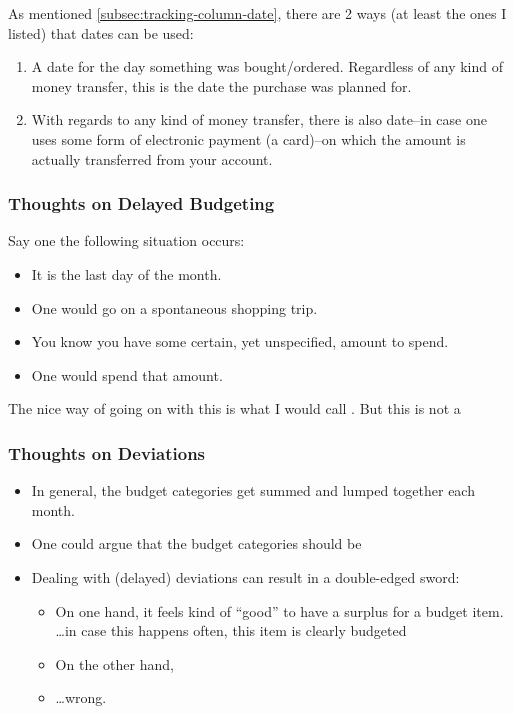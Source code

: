 As mentioned \autoref{subsec:tracking-column-date}, there are 2 ways (at least the ones I listed) that dates can be used:
\begin{enumerate}
	\item A date for the day something was bought/ordered.
	Regardless of any kind of money transfer, this is the date the purchase was planned for.
	\item With regards to any kind of money transfer, there is also date--in case one uses some form of electronic payment (\eg a card)--on which the amount is actually transferred from your account.
\end{enumerate}

\subsubsection{Thoughts on Delayed Budgeting}
\label{subsubsec:thoughts-delayed-budgeting}

Say one the following situation occurs:
\begin{itemize}
	\item It is the last day of the month.
	\item One would go on a spontaneous shopping trip.
	\item You know you have some certain, yet unspecified, amount to spend.
	\item One would spend that amount.
\end{itemize}

The nice way of going on with this is what I would call .
But this is not a 

\subsubsection{Thoughts on Deviations}
\label{subsubsec:thoughts-deviations}

\begin{itemize}
	\item In general, the budget categories get summed and lumped together each month.
	\item One could argue that the budget categories should be 
	\item Dealing with (delayed) deviations can result in a double-edged sword:
	\begin{itemize}
		\item On one hand, it feels kind of ``good'' to have a surplus for a budget item.\\
		\ldots in case this happens often, this item is clearly budgeted
		\item On the other hand, 
		\item \ldots wrong.
	\end{itemize}
\end{itemize}


